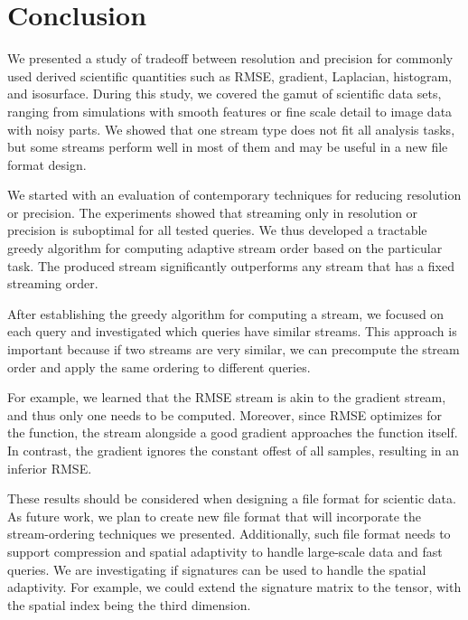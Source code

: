 \section{Conclusion}

We presented a study of tradeoff between resolution and precision for commonly used derived
scientific quantities such as RMSE, gradient, Laplacian, histogram, and isosurface.
During this study, we covered the gamut of scientific data sets, ranging from simulations
with smooth features or fine scale detail to image data with noisy parts.
We showed that one stream type does not fit all analysis tasks, but some streams perform well
in most of them and may be useful in a new file format design.

We started with an evaluation of contemporary techniques for reducing resolution or precision.
The experiments showed that streaming only in resolution or precision is suboptimal for all
tested queries. We thus developed a tractable greedy algorithm for computing adaptive stream order
based on the particular task. The produced stream significantly outperforms any stream that has
a fixed streaming order.

After establishing the greedy algorithm for computing a stream, we focused on each query and
investigated which queries have similar streams. This approach is important because if two streams
are very similar, we can precompute the stream order and apply the same ordering to different
queries.

For example, we learned that the RMSE stream is akin to the gradient stream, and thus only one
needs to be computed. Moreover, since RMSE optimizes for the function, the stream alongside
a good gradient approaches the function itself. In contrast, the gradient ignores the constant offest
of all samples, resulting in an inferior RMSE.


These results should be considered when designing a file format for scientic data. As future work,
we plan to create new file format that will incorporate the stream-ordering techniques we presented.
Additionally, such file format needs to support compression and spatial adaptivity to handle large-scale
data and fast queries. We are investigating if signatures can be used to handle
the spatial adaptivity. For example, we could extend the signature matrix to the tensor, with
the spatial index being the third dimension.
